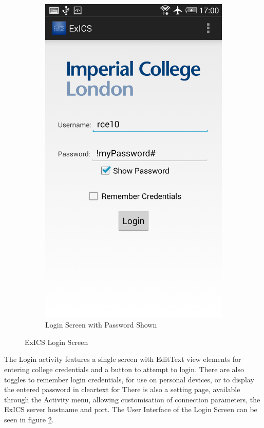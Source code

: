 \begin{figure}[h]
\begin{subfigure}[b]{0.35\textwidth}
		\includegraphics[width=\textwidth]{"screenshots/login_show_pass"}
		\caption{Login Screen with Password Shown}
		\label{subfig:showpassword}
	\end{subfigure}
	\caption{ExICS Login Screen}
	\label{fig:exics_login}
\end{figure}

\FloatBarrier

The Login activity features a single screen with EditText\cite{androidEditText} view elements for entering college credentials and a button to attempt to login.  There are also toggles to remember login credentials, for use on personal devices, or to display the entered password in cleartext for  There is also a setting page, available through the Activity menu, allowing customisation of connection parameters, the ExICS server hostname and port.  The User Interface of the Login Screen can be seen in figure \ref{fig:exics_login}.

